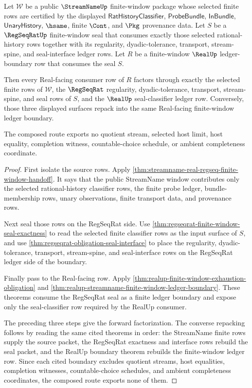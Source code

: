 \begin{theorem}
\label{thm:streamname-regseqrat-real-seal-composition}
Let $\mathcal{W}$ be a public $\StreamNameUp$ finite-window package whose
selected finite rows are certified by the displayed
$\mathsf{RatHistoryClassifier}$, $\mathsf{ProbeBundle}$,
$\mathsf{InBundle}$, $\mathsf{UnaryHistory}$, $\hsame$, finite $\Cont$, and
$\Pkg$ provenance data. Let $S$ be a $\RegSeqRatUp$ finite-window seal that
consumes exactly those selected rational-history rows together with its
regularity, dyadic-tolerance, transport, stream-spine, and seal-interface
ledger rows. Let $R$ be a finite-window $\RealUp$ ledger-boundary row that
consumes the seal $S$.

Then every Real-facing consumer row of $R$ factors through exactly the selected
finite rows of $\mathcal{W}$, the $\RegSeqRat$ regularity,
dyadic-tolerance, transport, stream-spine, and seal rows of $S$, and the
$\RealUp$ seal-classifier ledger row. Conversely, those three displayed
surfaces repack into the same Real-facing finite-window ledger boundary.

The composed route exports no quotient stream, selected host limit, host
equality, completion witness, countable-choice schedule, or ambient
completeness coordinate.
\end{theorem}
\begin{proof}
First isolate the source rows. Apply
\autoref{thm:streamname-real-regseq-finite-window-handoff}. It says that the
public StreamName window contributes only the selected rational-history
classifier rows, the finite probe ledger, bundle-membership rows, unary
observations, finite transport data, and provenance rows.

Next seal those rows on the RegSeqRat side. Use
\autoref{thm:regseqrat-finite-window-seal-exactness} to read the selected
finite classifier rows as the input surface of $S$, and use
\autoref{thm:regseqrat-obligation-seal-interface} to place the regularity,
dyadic-tolerance, transport, stream-spine, and seal-interface rows on the
RegSeqRat ledger side of the boundary.

Finally pass to the Real-facing row. Apply
\autoref{thm:realup-finite-window-exhaustion-obligation} and
\autoref{thm:realup-streamname-finite-window-ledger-boundary}. These theorems
consume the RegSeqRat seal as a finite ledger boundary and expose only the
seal-classifier row required by the RealUp consumer.

The preceding three steps give the forward factorization. The converse
repacking follows by reading the same cited theorems in order: the StreamName
finite rows supply the source packet, the RegSeqRat exactness and interface
rows rebuild the seal packet, and the RealUp boundary theorem rebuilds the
finite-window ledger row. Since each cited boundary excludes quotient streams,
host equalities, completion witnesses, countable-choice schedules, and ambient
completeness coordinates, the composed route exports none of them.
\end{proof}

